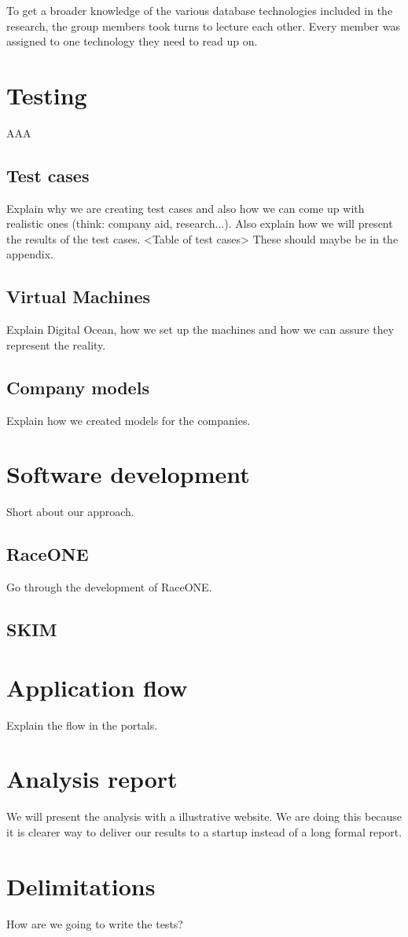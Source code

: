 To get a broader knowledge of the various database technologies included in the research, the group members took turns to lecture each other. Every member was assigned to one technology they need to read up on.


\section{Testing}
AAA
\subsection{Test cases}
Explain why we are creating test cases and also how we can come up with realistic ones (think: company aid, research...). Also explain how we will present the results of the test cases.
\newline\newline
<Table of test cases> These should maybe be in the appendix.
\subsection{Virtual Machines}
Explain Digital Ocean, how we set up the machines and how we can assure they represent the reality.
\subsection{Company models}
Explain how we created models for the companies.

\section{Software development}
Short about our approach.
\subsection{RaceONE}
Go through the development of RaceONE.
\subsection{SKIM}
%
%
\section{Application flow}
Explain the flow in the portals.

\section{Analysis report}
We will present the analysis with a illustrative website. We are doing this because it is clearer way to deliver our results to a startup instead of a long formal report. 

\section{Delimitations}
How are we going to write the tests?
